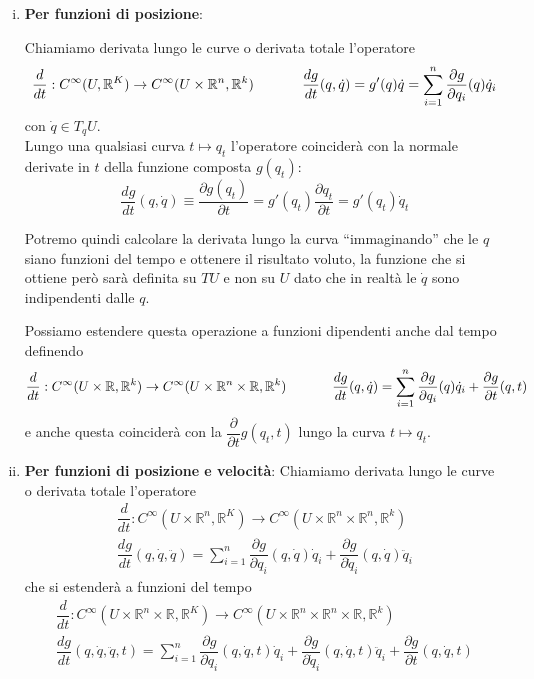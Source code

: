 \documentclass[11pt,a4paper,twoside]{book}
\theoremstyle{esss}
\theoremstyle{dotless}
\numberwithin{equation}{section} %
\begin{document}
\begin{enumerate}[i.]
\item \textbf{Per funzioni di posizione}:

Chiamiamo derivata lungo le curve o derivata totale l'operatore
\begin{equation}
\dfrac{d}{dt} :C^{\infty}(U,\mathbb{R}^K) \rightarrow C^{\infty}(U\times\mathbb{R}^n,\mathbb{R}^k) \hspace{0.1\linewidth}
\dfrac{dg}{dt} (q,\dot{q}) = g'(q) \dot{q} =\sum_{i=1}^n \dfrac{\partial g}{\partial q_i}(q) \dot{q}_i
\end{equation}
con $\dot{q}\in T_qU$.\\
Lungo una qualsiasi curva $t\mapsto q_t$ l'operatore coinciderà con la normale derivate in $t$ della funzione composta $g(q_t)$:
\[
\dfrac{dg}{dt}(q,\dot{q}) \equiv \dfrac{\partial g(q_t)}{\partial t}=g'(q_t)\dfrac{\partial q_t}{\partial t}= g'(q_t)\dot{q}_t
\]

Potremo quindi calcolare la derivata lungo la curva ``immaginando'' che le $q$ siano funzioni del tempo e ottenere il risultato voluto, la funzione che si ottiene però sarà definita su $TU$ e non su $U$ dato che in realtà le $\dot{q}$ sono indipendenti dalle $q$.

Possiamo estendere questa operazione a funzioni dipendenti anche dal tempo definendo
\[
\dfrac{d}{dt} : C^{\infty}(U\times\mathbb{R},\mathbb{R}^k)\rightarrow C^{\infty}(U\times\mathbb{R}^n\times\mathbb{R},\mathbb{R}^k) \hspace{0.1\linewidth}
\dfrac{dg}{dt} (q,\dot{q}) =\sum_{i=1}^n \dfrac{\partial g}{\partial q_i}(q) \dot{q}_i + \dfrac{\partial g}{\partial t}(q,t)
\]
e anche questa coinciderà con la $\dfrac{\partial}{\partial t} g(q_t,t)$ lungo la curva $t\mapsto q_t$.

\item \textbf{Per funzioni di posizione e velocità}:
Chiamiamo derivata lungo le curve o derivata totale l'operatore
\begin{equation}\begin{split}
\dfrac{d}{dt} :C^{\infty}(U\times\mathbb{R}^n,\mathbb{R}^K) \rightarrow C^{\infty}(U\times\mathbb{R}^n\times\mathbb{R}^n,\mathbb{R}^k) \\
\dfrac{dg}{dt} (q,\dot{q},\ddot{q}) =\sum_{i=1}^n \dfrac{\partial g}{\partial q_i}(q,\dot{q}) \dot{q}_i + \dfrac{\partial g}{\partial \dot{q}_i}(q,\dot{q})\ddot{q}_i
\end{split}
\end{equation}
che si estenderà a funzioni del tempo 
\begin{equation}\begin{split}
\dfrac{d}{dt} :C^{\infty}(U\times\mathbb{R}^n\times\mathbb{R},\mathbb{R}^K) \rightarrow C^{\infty}(U\times\mathbb{R}^n\times\mathbb{R}^n\times\mathbb{R},\mathbb{R}^k) \\
\dfrac{dg}{dt} (q,\dot{q},\ddot{q},t) =\sum_{i=1}^n \dfrac{\partial g}{\partial q_i}(q,\dot{q},t) \dot{q}_i + \dfrac{\partial g}{\partial \dot{q}_i}(q,\dot{q},t)\ddot{q}_i+\dfrac{\partial g}{\partial t}(q,\dot{q},t)
\end{split}
\end{equation}
\end{enumerate}
\end{document}
